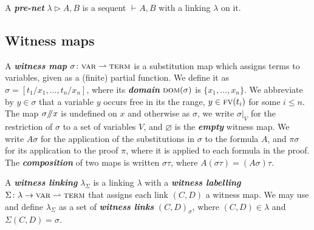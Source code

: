 \documentclass[UKenglish]{lipics-v2016}
\theoremstyle{plain}
\newcommand\defn[1]{\textit{\textbf{#1}}}
\newcommand\var{\textsc{var}}
\newcommand\terms{\textsc{term}}
\newcommand\dom[1]{\textsc{dom}(#1)}
\newcommand\+{+}
\renewcommand\*{\times}
\newcommand\seq[3][]{{\vdash_{#1}}#2,#3}
\newcommand\fv{\textsc{fv}}
\newcommand\net[3]{#1\triangleright #2,#3}
\newcommand\minus{\mathop{\!/\mathchoice{\kern-3pt}{\kern-3pt}{\kern-2.5pt}{\kern-2pt}/\!}}
\newcommand\res[1]{|_{#1}}
\newcommand\link[3][\sigma]{(#2,#3)_{#1}}
\begin{document}
\begin{definition}
A \defn{pre-net} $\net\lambda AB$ is a sequent $\seq AB$ with a linking $\lambda$ on it.
\end{definition}


\subsection{Witness maps}

A \defn{witness map} $\sigma\colon\var\rightharpoonup\terms$ is a substitution map which assigns terms to variables, given as a (finite) partial function. We define it as $\sigma=[t_1/x_1,\dots,t_n/x_n]$, where its \defn{domain} $\dom\sigma$ is $\{x_1,\dots,x_n\}$. We abbreviate by $y\in\sigma$ that a variable $y$ occurs free in its the range, $y\in\fv(t_i)$ for some $i\leq n$. The map $\sigma\minus x$ is undefined on $x$ and otherwise as $\sigma$, we write $\sigma\res V$ for the restriction of $\sigma$ to a set of variables $V$, and $\varnothing$ is the \defn{empty} witness map.
%
We write $A\sigma$ for the application of the substitutions in $\sigma$ to the formula $A$, and $\pi\sigma$ for its application to the proof $\pi$, where it is applied to each formula in the proof. The \defn{composition} of two maps is written $\sigma\tau$, where $A(\sigma\tau)=(A\sigma)\tau$.


A \defn{witness linking} $\lambda_\Sigma$ is a linking $\lambda$ with a \defn{witness labelling} $\Sigma\colon\lambda\to\var\rightharpoonup\terms$ that assigns each link $(C,D)$ a witness map. We may use and define $\lambda_\Sigma$ as a set of \defn{witness links} $\link CD$, where $(C,D)\in\lambda$ and $\Sigma(C,D)=\sigma$.
\end{document}
